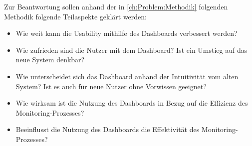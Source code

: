 \noindent
Zur Beantwortung sollen anhand der in \autoref{ch:Problem:Methodik} folgenden Methodik folgende Teilaspekte geklärt werden:
\begin{itemize}
    
    \item Wie weit kann die Usability mithilfe des Dash\-boards verbessert werden?
    
    \item Wie zufrieden sind die Nutzer mit dem Dash\-board?
          Ist ein Umstieg auf das neue System denkbar?
    
    \item Wie unterscheidet sich das Dash\-board anhand der Intuitivität vom alten System?
          Ist es auch für neue Nutzer ohne Vorwissen geeignet?
          
    \item Wie wirksam ist die Nutzung des Dash\-boards in Bezug auf die Effizienz des Monitoring-Prozesses?
    
    \item Beeinflusst die Nutzung des Dash\-boards die Effektivität des Monitoring-Prozesses?
\end{itemize}

